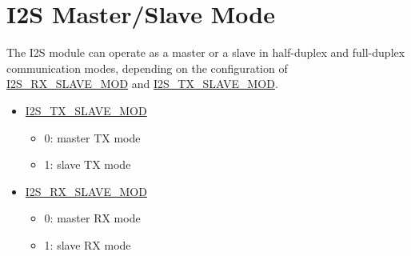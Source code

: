 \documentclass[main\_\_EN.tex]{subfiles}
\begin{document}
\section{I2S Master/Slave Mode}

The \chipname{} I2S module can operate as a master or a slave in half-duplex and full-duplex communication modes, depending on the configuration of  \hyperref[fielddesc:I2SRXSLAVEMOD]{I2S\_RX\_SLAVE\_MOD} and  \hyperref[fielddesc:I2STXSLAVEMOD]{I2S\_TX\_SLAVE\_MOD}.

\begin{itemize}
    \item \hyperref[fielddesc:I2STXSLAVEMOD]{I2S\_TX\_SLAVE\_MOD} 
    \begin{itemize}
        \item 0: master TX mode
        \item 1: slave TX mode
    \end{itemize}
    \item \hyperref[fielddesc:I2SRXSLAVEMOD]{I2S\_RX\_SLAVE\_MOD}
    \begin{itemize}
        \item 0: master RX mode
        \item 1: slave RX mode
    \end{itemize}
\end{itemize}
\end{document}
